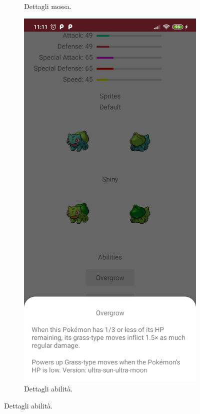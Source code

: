 \documentclass[a4paper,11pt]{article}
\begin{document}
\begin{figure}[h!]
{\begin{subfigure}[b]{0.3\linewidth}
    \caption{Dettagli mossa.}
  \end{subfigure}
    \begin{subfigure}[b]{0.3\linewidth}
    \includegraphics[width=\linewidth]{ability.jpg}
    \caption{Dettagli abilità.}
  \end{subfigure}}
\end{figure}
\newpage
\end{document}
